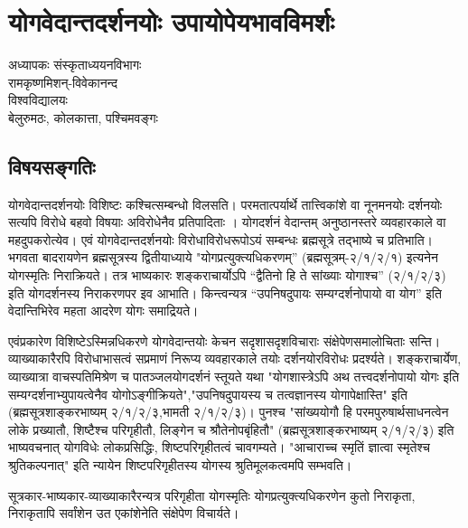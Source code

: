 \chapter{योगवेदान्तदर्शनयोः  उपायोपेयभावविमर्शः}

\begin{center}
\smallskip

अध्यापकः संस्कृताध्ययनविभागः\\
रामकृष्णमिशन्-विवेकानन्द\\
विश्वविद्यालयः\\
बेलुरुमठः, कोलकात्ता, पश्चिमवङ्गः
\addrule
\end{center}

\section*{विषयसङ्गतिः}

योगवेदान्तदर्शनयोः विशिष्टः कश्चित्सम्बन्धो विलसति। परमतात्पर्यार्थे तात्त्विकांशे वा नूनमनयोः दर्शनयोः सत्यपि विरोधे बहवो विषयाः अविरोधेनैव प्रतिपादिताः । योगदर्शनं वेदान्तम् अनुष्ठानस्तरे व्यवहारकाले वा महदुपकरोत्येव। एवं योगवेदान्तदर्शनयोः विरोधाविरोधरूपोऽयं सम्बन्धः ब्रह्मसूत्रे तद्भाष्ये च प्रतिभाति। भगवता बादरायणेन ब्रह्मसूत्रस्य द्वितीयाध्याये "योगप्रत्युक्त्यधिकरणम्” (ब्रह्मसूत्रम्-२/१/२/१) इत्यनेन योगस्मृतिः निराक्रियते। तत्र भाष्यकारः शङ्कराचार्योऽपि “द्वैतिनो हि ते सांख्याः योगाश्च” (२/१/२/३) इति योगदर्शनस्य निराकरणपर इव आभाति। किन्त्वन्यत्र “उपनिषदुपायः सम्यग्दर्शनोपायो वा योग” इति वेदान्तिभिरेव महता आदरेण योगः समाद्रियते।

एवंप्रकारेण विशिष्टेऽस्मिन्नधिकरणे योगवेदान्तयोः केचन सदृशासदृशविचाराः संक्षेपेणसमालोचिताः सन्ति। व्याख्याकारैरपि विरोधाभासत्वं सप्रमाणं निरूप्य व्यवहारकाले तयोः दर्शनयोरविरोधः प्रदर्श्यते। शङ्कराचार्येण, व्याख्यात्रा वाचस्पतिमिश्रेण च पातञ्जलयोगदर्शनं स्तूयते यथा "योगशास्त्रेऽपि अथ तत्त्वदर्शनोपायो योगः इति सम्यग्दर्शनाभ्युपायत्वेनैव योगोऽङ्गीक्रियते","उपनिषदुपायस्य च तत्वज्ञानस्य योगापेक्षास्ति" इति (ब्रह्मसूत्रशाङ्करभाष्यम् २/१/२/३,भामती २/१/२/३)। पुनश्च "सांख्ययोगौ हि परमपुरुषार्थसाधनत्वेन लोके प्रख्यातौ, शिष्टैश्च परिगृहीतौ, लिङ्गेन च श्रौतेनोपबृंहितौ" (ब्रह्मसूत्रशाङ्करभाष्यम् २/१/२/३) इति भाष्यवचनात् योगविधेः लोकप्रसिद्धिः, शिष्टपरिगृहीतत्वं चावगम्यते। "आचाराच्च स्मृतिं ज्ञात्वा स्मृतेश्च श्रुतिकल्पनात्" इति न्यायेन शिष्टपरिगृहीतस्य योगस्य श्रुतिमूलकत्वमपि सम्भवति।

सूत्रकार-भाष्यकार-व्याख्याकारैरन्यत्र परिगृहीता योगस्मृतिः योगप्रत्युक्त्यधिकरणेन कुतो निराकृता, निराकृतापि सर्वांशेन उत एकांशेनेति संक्षेपेण विचार्यते।

